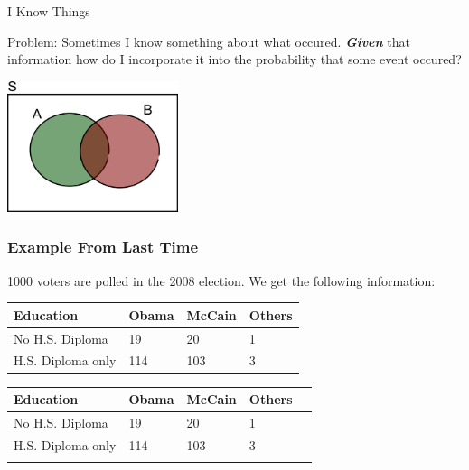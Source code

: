 \begin{frame}{I Know Things}

  Problem: Sometimes I know something about what
  occured. \textit{\textbf{Given}} that information how do I incorporate it
  into the probability that some event occured?

  \vfill
  \includegraphics[width=5cm]{img/vennDiagram}
  \vfill
  
\end{frame}

\begin{frame}
  \frametitle{Example From Last Time}

  1000 voters are polled in the 2008 election. We get the following
  information: \\
  {
    \begin{tabular}{l|l|l|l}
      Education & Obama & McCain & Others  \\ \hline
      No H.S. Diploma & 19 & 20 & 1   \\
      H.S. Diploma only & 114 & 103 & 3 
    \end{tabular}
  }
  {
    \begin{tabular}{l|l|l|l|l}
      Education & Obama & McCain & Others & \color{red}{Total} \\ \hline
      No H.S. Diploma & 19 & 20 & 1 & \color{red}{40} \\
      H.S. Diploma only & 114 & 103 & 3 & \color{red}{220} \\ \hline
      \color{red}{Total} & \color{red}{133} & \color{red}{123} & \color{red}{4} & \color{blue}{260}
    \end{tabular}
  }

  \vfill




\end{frame}



